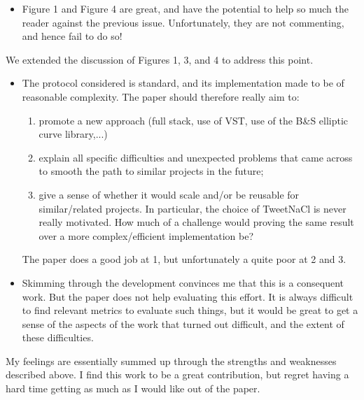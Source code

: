 \begin{itemize}
  \item Figure 1 and Figure 4 are great, and have the potential to help so much the reader against the previous issue. Unfortunately, they are not commenting, and hence fail to do so!
\end{itemize}
\begin{answer}
  We extended the discussion of Figures 1, 3, and 4 to address this point.
\end{answer}
\begin{itemize}
  \item The protocol considered is standard, and its implementation made to be of reasonable complexity. The paper should therefore really aim to:
    \begin{enumerate}
      \item promote a new approach (full stack, use of VST, use of the B\&S elliptic curve library,...)
      \item explain all specific difficulties and unexpected problems that came across to smooth the path to similar projects in the future;
      \item give a sense of whether it would scale and/or be reusable for similar/related projects. In particular, the choice of TweetNaCl is never really motivated. How much of a challenge would proving the same result over a more complex/efficient implementation be?
    \end{enumerate}

    The paper does a good job at 1, but unfortunately a quite poor at 2 and 3.
  \item Skimming through the development convinces me that this is a consequent work. But the paper does not help evaluating this effort. It is always difficult to find relevant metrics to evaluate such things, but it would be great to get a sense of the aspects of the work that turned out difficult, and the extent of these difficulties.
\end{itemize}
\begin{answer}
\end{answer}


\begin{center}
\end{center}
My feelings are essentially summed up through the strengths and weaknesses described above. I find this work to be a great contribution, but regret having a hard time getting as much as I would like out of the paper.

